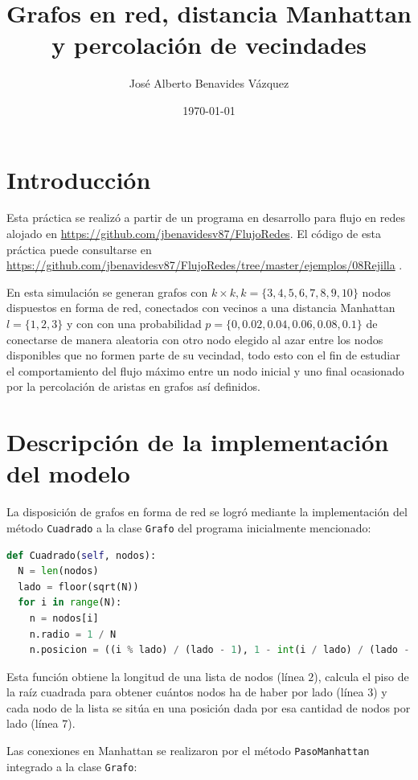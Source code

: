 \documentclass{article}
\title{Grafos en red, distancia Manhattan y percolación de vecindades}
\author{José Alberto Benavides Vázquez}
\date{\today}
\begin{document}
  \maketitle

  \section{Introducción}

  Esta práctica se realizó a partir de un programa en desarrollo para flujo en redes alojado en \url{https://github.com/jbenavidesv87/FlujoRedes}. El código de esta práctica puede consultarse en \url{https://github.com/jbenavidesv87/FlujoRedes/tree/master/ejemplos/08Rejilla} \cite{Grafos}.

  En esta simulación se generan grafos con $k \times k, k = \{ 3, 4, 5, 6, 7, 8, 9, 10 \}$ nodos dispuestos en forma de red, conectados con vecinos a una distancia Manhattan $l = \{ 1, 2, 3 \}$ y con con una probabilidad $p = \{ 0, 0.02, 0.04, 0.06, 0.08, 0.1 \} $ de conectarse de manera aleatoria con otro nodo elegido al azar entre los nodos disponibles que no formen parte de su vecindad, todo esto con el fin de estudiar el comportamiento del flujo máximo entre un nodo inicial y uno final ocasionado por la percolación de aristas en grafos así definidos.


  \section{Descripción de la implementación del modelo}

  La disposición de grafos en forma de red se logró mediante la implementación del método \texttt{Cuadrado} a la clase \texttt{Grafo} del programa inicialmente mencionado:

  \begin{lstlisting}[language = Python]
def Cuadrado(self, nodos):
  N = len(nodos)
  lado = floor(sqrt(N))
  for i in range(N):
    n = nodos[i]
    n.radio = 1 / N
    n.posicion = ((i % lado) / (lado - 1), 1 - int(i / lado) / (lado - 1))
  \end{lstlisting}

  Esta función obtiene la longitud de una lista de nodos (línea $2$), calcula el piso de la raíz cuadrada para obtener cuántos nodos ha de haber por lado (línea $3$) y cada nodo de la lista se sitúa en una posición dada por esa cantidad de nodos por lado (línea $7$).

  Las conexiones en Manhattan se realizaron por el método \texttt{PasoManhattan} integrado a la clase \texttt{Grafo}:
\end{document}
